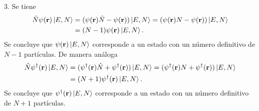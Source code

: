 \documentclass{article}
\begin{document}
3. Se tiene
\begin{align}
\begin{split}
\hat{N}\psi(\vb{r})\ket{E,N}&=(\psi(\vb{r})\hat{N}-\psi(\vb{r}))\ket{E,N}=(\psi(\vb{r})N-\psi(\vb{r}))\ket{E,N}\\
&=(N-1)\psi(\vb{r})\ket{E,N}.
\end{split}
\end{align}
Se concluye que $\psi(\vb{r})\ket{E,N}$ corresponde a un estado con un número definitivo de $N-1$ partículas. De manera análoga
\begin{align}
\begin{split}
\hat{N}\psi^\dagger(\vb{r})\ket{E,N}&=(\psi^\dagger(\vb{r})\hat{N}+\psi^\dagger(\vb{r}))\ket{E,N}=(\psi^\dagger(\vb{r})N+\psi^\dagger(\vb{r}))\ket{E,N}\\
&=(N+1)\psi^\dagger(\vb{r})\ket{E,N}.
\end{split}
\end{align}
Se concluye que $\psi^\dagger(\vb{r})\ket{E,N}$ corresponde a un estado con un número definitivo de $N+1$ partículas.
\end{document}
